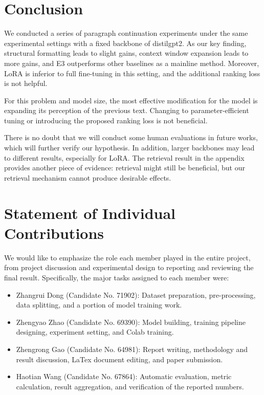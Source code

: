 \documentclass{article}
\newcommand{\model}{\mbox{\normalfont distilgpt2}}
\newcommand{\expid}[1]{\textsc{#1}}
\begin{document}
\section{Conclusion}

We conducted a series of paragraph continuation experiments under the same experimental settings with a fixed backbone of \model{}. As our key finding, structural formatting leads to slight gains, context window expansion leads to more gains, and \expid{E3} outperforms other baselines as a mainline method. Moreover, LoRA is inferior to full fine-tuning in this setting, and the additional ranking loss is not helpful.

For this problem and model size, the most effective modification for the model is expanding its perception of the previous text. Changing to parameter-efficient tuning or introducing the proposed ranking loss is not beneficial.

There is no doubt that we will conduct some human evaluations in future works, which will further verify our hypothesis. In addition, larger backbones may lead to different results, especially for LoRA. The retrieval result in the appendix provides another piece of evidence: retrieval might still be beneficial, but our retrieval mechanism cannot produce desirable effects.

\section{Statement of Individual Contributions}

We would like to emphasize the role each member played in the entire project, from project discussion and experimental design to reporting and reviewing the final result. Specifically, the major tasks assigned to each member were:

\begin{itemize}
\item Zhangrui Dong (Candidate No. 71902): Dataset preparation, pre-processing, data splitting, and a portion of model training work.
\item Zhengyao Zhao (Candidate No. 69390): Model building, training pipeline designing, experiment setting, and Colab training.
\item Zhengrong Gao (Candidate No. 64981): Report writing, methodology and result discussion, LaTex document editing, and paper submission.
\item Haotian Wang (Candidate No. 67864): Automatic evaluation, metric calculation, result aggregation, and verification of the reported numbers.
\end{itemize}
\end{document}
